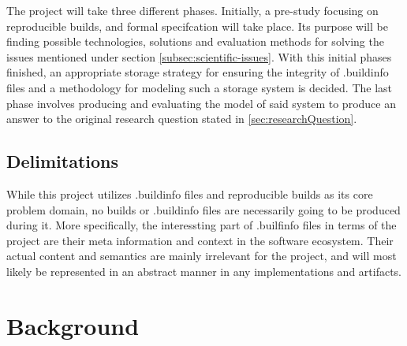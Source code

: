 \documentclass[english, biblatex, digitaloutput]{kththesis}
\begin{document}
The project will take three different phases. Initially, a pre-study focusing on reproducible builds,  and formal specifcation will take place. Its purpose will be finding possible technologies, solutions and evaluation methods for solving the issues mentioned under section \ref{subsec:scientific-issues}. With this initial phases finished, an appropriate storage strategy for ensuring the integrity of .buildinfo files and a methodology for modeling such a storage system is decided. The last phase involves producing and evaluating the model of said system to produce an answer to the original research question stated in \ref{sec:researchQuestion}.

\section{Delimitations}

While this project utilizes .buildinfo files and reproducible builds as its core problem domain, no builds or .buildinfo files are necessarily going to be produced during it. More specifically, the interessting part of .builfinfo files in terms of the project are their meta information and context in the software ecosystem. Their actual content and semantics are mainly irrelevant for the project, and will most likely be represented in an abstract manner in any implementations and artifacts.


\cleardoublepage
\chapter{Background}
\label{ch:background}
\end{document}
